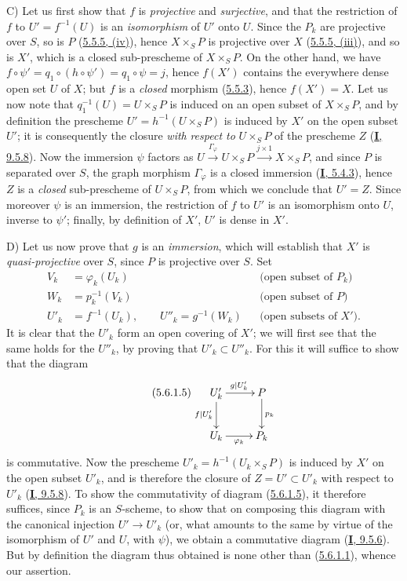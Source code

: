C) Let us first show that $f$ is \emph{projective} and \emph{surjective}, and that the
restriction of $f$ to $U'=f^{-1}(U)$ is an \emph{isomorphism} of $U'$ onto $U$.
Since the $P_k$ are projective over $S$, so is $P$
(\hyperref[II.5.5.5]{5.5.5, (iv)}), hence $X\times_SP$ is projective over
$X$ (\hyperref[II.5.5.5]{5.5.5, (iii)}), and so is $X'$, which is a
closed sub-prescheme of $X\times_SP$. On the other hand, we have
$f\circ\psi'=q_1\circ(h\circ\psi')=q_1\circ\psi=j$, hence $f(X')$ contains
the everywhere dense open set $U$ of $X$; but $f$ is a \emph{closed} morphism
(\hyperref[II.5.5.3]{5.5.3}), hence $f(X')=X$. Let us now note that
$q_1^{-1}(U)=U\times_SP$ is induced on an open subset of $X\times_SP$, and
by definition the prescheme $U'=h^{-1}(U\times_SP)$ is induced by $X'$ on
the open subset $U'$; it is consequently the closure \emph{with}
\emph{respect to} $U\times_SP$ of the prescheme $Z$
(\hyperref[I.9.5.8]{\textbf{I}, 9.5.8}). Now the immersion $\psi$ factors as $U\xrightarrow{\Gamma_\varphi}U\times_SP\xrightarrow{j\times1}X\times_SP$,
and since $P$ is separated over $S$, the graph morphism $\Gamma_\varphi$ is
a closed immersion (\hyperref[I.5.4.3]{\textbf{I}, 5.4.3}), hence $Z$ is a
\emph{closed} sub-prescheme of $U\times_SP$, from which we conclude that $U'=Z$.
Since moreover $\psi$ is an immersion, the restriction of $f$ to $U'$ is an
isomorphism onto $U$, inverse to $\psi'$; finally, by definition of $X'$,
$U'$ is dense in $X'$.

D) Let us now prove that $g$ is an \emph{immersion}, which will establish that $X'$
is \emph{quasi-projective} over $S$, since $P$ is projective over $S$. Set
\begin{align*}
V_k&=\varphi_k(U_k) &&\text{(open subset of $P_k$)}\\
W_k&=p_k^{-1}(V_k) &&\text{(open subset of $P$)}\\
U'_k&=f^{-1}(U_k),\qquad U''_k=g^{-1}(W_k)
&&\text{(open subsets of $X'$)}.
\end{align*}
It is clear that the $U'_k$ form an open covering of $X'$; we will first see
that the same holds for the $U''_k$, by proving that
$U'_k\subset U''_k$. For this it will suffice to show that the diagram
\[
\tag{5.6.1.5}
\label{II.5.6.1.5}
\xymatrix{
U'_k\ar[r]^{g|U'_k}\ar[d]_{f|U'_k} & P\ar[d]^{p_k}\\
U_k\ar[r]_{\varphi_k} & P_k
}
\]
is commutative. Now the prescheme $U'_k=h^{-1}(U_k\times_SP)$ is induced by
$X'$ on the open subset $U'_k$, and is therefore the closure of
$Z=U'\subset U'_k$ with respect to $U'_k$ (\hyperref[I.9.5.8]{\textbf{I}, 9.5.8}).
To show the commutativity of diagram (\hyperref[II.5.6.1.5]{5.6.1.5}), it
therefore suffices, since $P_k$ is an $S$-scheme, to show that on composing
this diagram with the canonical injection $U'\to U'_k$ (or, what amounts to
the same by virtue of the isomorphism of $U'$ and $U$, with $\psi$), we
obtain a commutative diagram (\hyperref[I.9.5.6]{\textbf{I}, 9.5.6}). But by
definition the diagram thus obtained is none other than
(\hyperref[II.5.6.1.1]{5.6.1.1}), whence our assertion.

